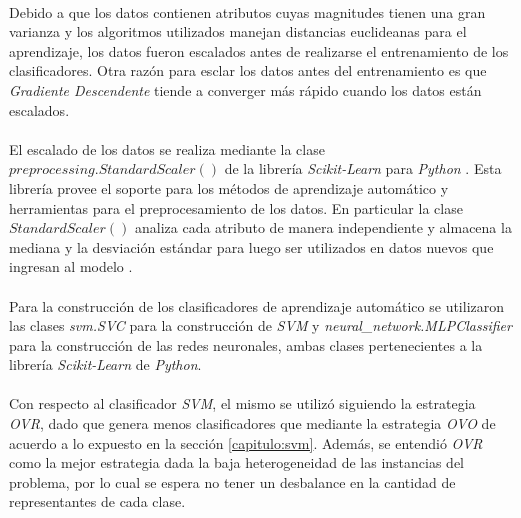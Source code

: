 \paragraph{} Debido a que los datos contienen atributos cuyas magnitudes tienen una gran varianza y los algoritmos utilizados manejan distancias euclideanas para el aprendizaje, los datos fueron escalados antes de realizarse el entrenamiento de los clasificadores. Otra razón para esclar los datos antes del entrenamiento es que \textit{Gradiente Descendente} tiende a converger más rápido cuando los datos están escalados\cite{gradiente-descendente-escalado}.

\paragraph{} El escalado de los datos se realiza mediante la clase $preprocessing.StandardScaler()$ de la librería \textit{Scikit-Learn} para \textit{Python} \cite{scikit-learn}. Esta librería provee el soporte para los métodos de aprendizaje automático y herramientas para el preprocesamiento de los datos. En particular la clase $StandardScaler()$ analiza cada atributo de manera independiente y almacena la mediana y la desviación estándar para luego ser utilizados en datos nuevos que ingresan al modelo \cite{StandardScaler-scikit-learn}.

\paragraph{} Para la construcción de los clasificadores de aprendizaje automático se utilizaron las clases \textit{svm.SVC} para la construcción de \textit{SVM} y \textit{neural\_network.MLPClassifier} para la construcción de las redes neuronales, ambas clases pertenecientes a la librería \textit{Scikit-Learn} de \textit{Python}.

\paragraph{} Con respecto al clasificador \textit{SVM}, el mismo se utilizó siguiendo la estrategia \textit{OVR}, dado que genera menos clasificadores que mediante la estrategia \textit{OVO} de acuerdo a lo expuesto en la sección \ref{capitulo:svm}. Además, se entendió \textit{OVR} como la mejor estrategia dada la baja heterogeneidad de las instancias del problema, por lo cual se espera no tener un desbalance en la cantidad de representantes de cada clase.

